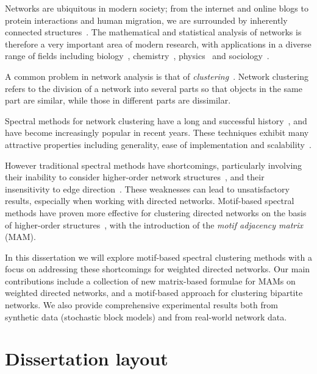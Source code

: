 \documentclass[12pt]{ociamthesis}
\theoremstyle{plain}
\theoremstyle{definition}
\theoremstyle{remark}
\begin{document}
Networks are ubiquitous in modern society; from the internet and online blogs
to protein interactions and human migration, we are surrounded by inherently
connected structures~\cite{kolaczyk2014statistical}.
The mathematical and statistical analysis of networks is therefore a very
important area of modern research, with applications in a diverse range of
fields including biology~\cite{albert2005scale},
chemistry~\cite{jacob2018statistics}, physics~\cite{newman2008physics} and
sociology~\cite{adamic2005political}.

A common problem in network analysis is that of
\emph{clustering}~\cite{schaeffer2007graph}.
Network clustering refers to the division of a network into several parts so
that objects in the same part are similar, while those in different parts are
dissimilar.

Spectral methods for network clustering have a long and successful
history~\cite{cheeger1969lower,donath1972algorithms,guattery1995performance},
and have become increasingly popular in recent years.
These techniques exhibit many attractive properties including generality, ease
of implementation and scalability~\cite{von2007tutorial}.

However traditional spectral methods have shortcomings, particularly involving
their inability to consider higher-order network
structures~\cite{benson2016higher}, and their insensitivity to edge
direction~\cite{DirectedClustImbCuts}. These weaknesses can lead to
unsatisfactory results, especially when working with directed networks.
Motif-based spectral methods have proven more effective for clustering directed
networks on the basis of higher-order
structures~\cite{tsourakakis2017scalable}, with the introduction of the
\emph{motif adjacency matrix} (MAM).

In this dissertation we will explore motif-based spectral clustering methods
with a focus on addressing these shortcomings for weighted directed networks.
Our main contributions include a collection of new matrix-based formulae for
MAMs on weighted directed networks, and a motif-based approach for clustering
bipartite networks. We also provide comprehensive experimental results both
from synthetic data (stochastic block models) and from real-world network data.

\section*{Dissertation layout}
\end{document}
